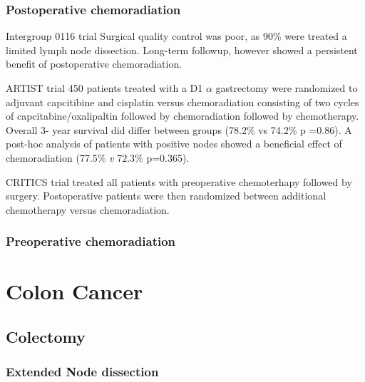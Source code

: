 \documentclass[
]{book}
\begin{document}
\hypertarget{postoperative-chemoradiation-1}{%
\section{Postoperative chemoradiation}\label{postoperative-chemoradiation-1}}

Intergroup 0116 trial \citep{macdonald725}
Surgical quality control was poor, as 90\% were treated a limited lymph node dissection. Long-term followup, however \citep{smalley2327} showed a persistent benefit of postoperative chemoradiation.

ARTIST trial 450 patients treated with a D1 \(\alpha\) gastrectomy were randomized to adjuvant capcitibine and cisplatin versus chemoradiation consisting of two cycles of capcitabine/oxalipaltin followed by chemoradiation followed by chemotherapy. Overall 3- year survival did differ between groups (78.2\% vs 74.2\% p =0.86). A post-hoc analysis of patients with positive nodes showed a beneficial effect of chemoradiation (77.5\% \emph{v} 72.3\% p=0.365).\citep{lee268}

CRITICS trial treated all patients with preoperative chemoterhapy followed by surgery. Postoperative patients were then randomized between additional chemotherapy versus chemoradiation.

\hypertarget{preoperative-chemoradiation}{%
\section{Preoperative chemoradiation}\label{preoperative-chemoradiation}}

\citep{ajani3953}

\hypertarget{part-colon-cancer}{%
\part*{Colon Cancer}\label{part-colon-cancer}}

\hypertarget{colectomy}{%
\chapter{Colectomy}\label{colectomy}}

\hypertarget{extended-node-dissection}{%
\section{Extended Node dissection}\label{extended-node-dissection}}
\end{document}

